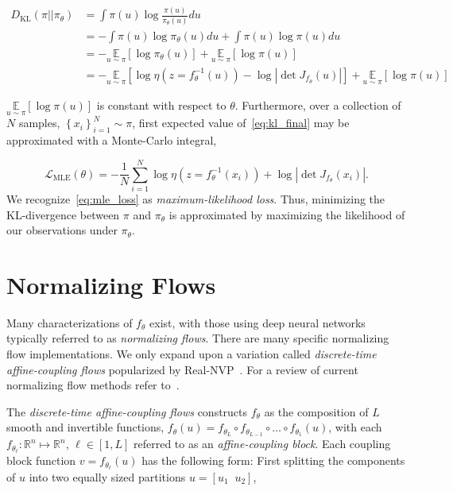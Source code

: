 \begin{align}
    D_{\text{KL}}(\pi || \pi_\theta) &= \int \pi(u) \log \frac{\pi(u)}{\pi_\theta(u)} du \nonumber \\
                                     &= -\int \pi(u) \log \pi_\theta(u) du + \int \pi(u) \log \pi(u) du \nonumber \\
                                     &= -\underset{u \sim \pi}{\mathbb{E}} \left[ \log \pi_\theta(u) \right] + \underset{u \sim \pi}{\mathbb{E}}\left[ \log \pi(u) \right] \nonumber \\
                                     &= -\underset{u \sim \pi}{\mathbb{E}} \left[ \log \eta\left(z = f_\theta^{-1}(u)\right) - \log \left| \det J_{f_\theta}(u) \right| \right] + \underset{u \sim \pi}{\mathbb{E}}\left[ \log \pi(u) \right]
    \label{eq:kl_final}
\end{align}

$\underset{u \sim \pi}{\mathbb{E}}\left[ \log \pi(u) \right]$ is constant with respect to $\theta$.
Furthermore, over a collection of $N$ samples,
$\left\{ x_i \right\}_{i=1}^{N} \sim \pi$, first expected value of~\eqref{eq:kl_final} may be approximated with
a Monte-Carlo integral,

\begin{equation}
    \mathcal{L}_{\text{MLE}}(\theta) = - \frac{1}{N} \sum_{i=1}^N \log \eta\left(z = f_\theta^{-1}(x_i)\right) + \log \left| \det J_{f_\theta}(x_i) \right|.
    \label{eq:mle_loss}
\end{equation}
We recognize~\eqref{eq:mle_loss} as \textit{maximum-likelihood loss}.
Thus, minimizing the KL-divergence between $\pi$ and $\pi_\theta$ is approximated by maximizing the likelihood of our
observations under $\pi_\theta$.

\section{Normalizing Flows}\label{sec:normalizing-flows}

Many characterizations of $f_\theta$ exist, with those using deep neural networks typically referred to as
\textit{normalizing flows}.
There are many specific normalizing flow implementations.
We only expand upon a variation called \textit{discrete-time affine-coupling flows} popularized by Real-NVP~\cite{real_nvp}.
For a review of current normalizing flow methods refer to~\cite{Kobyzev_2021}.

The \textit{discrete-time affine-coupling flows} constructs $f_\theta$ as the composition of $L$ smooth and invertible functions,
$f_\theta(u) = f_{\theta_L} \circ f_{\theta_{L-1}} \circ \dots \circ f_{\theta_1}(u)$, with each
$f_{\theta_\ell} : \mathbb{R}^n \mapsto \mathbb{R}^n$, $\ell \in [1, L]$ referred to as an \textit{affine-coupling block}.
Each coupling block function $v = f_{\theta_\ell}(u)$ has the following form: First splitting the components of $u$
into two equally sized partitions $u = \left[ u_1 \;\; u_2 \right]$,


